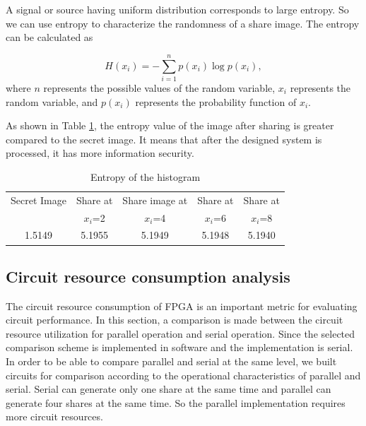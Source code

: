 A signal or source having uniform distribution corresponds to large entropy. So we can use entropy to characterize the randomness of a share image. The entropy can be calculated as

\begin{equation}
H(x_{i})=-\sum_{i=1}^{n} p\left(x_{i}\right) \log p\left(x_{i}\right),
\end{equation}where $n$ represents the possible values of the random variable, $x_{i}$ represents the random variable, and $p\left ( x_{i} \right ) $ represents the probability function of $x_{i}$.

As shown in Table \ref{tab1}, the entropy value of the image after sharing is greater compared to the secret image. It means that after the designed system is processed, it has more information security.

\begin{table}[!htb]
	\begin{center}
	\caption{Entropy of the histogram}\label{tab1}%
	\begin{tabular}{ccccc}
		\toprule
		Secret Image&Share at&Share image at&Share at&Share at\\
		&$x_{i}$=2&$x_{i}$=4&$x_{i}$=6&$x_{i}$=8\\
		\midrule
		1.5149&5.1955&5.1949&5.1948&5.1940\\
		\bottomrule
	\end{tabular}
	\end{center}
\end{table}

\subsection{Circuit resource consumption analysis}\label{subsec52}

The circuit resource consumption of FPGA is an important metric for evaluating circuit performance. In this section, a comparison is made between the circuit resource utilization for parallel operation and serial operation. {\color{red}Since the selected comparison scheme is implemented in software and the implementation is serial. In order to be able to compare parallel and serial at the same level, we built circuits for comparison according to the operational characteristics of parallel and serial. Serial can generate only one share at the same time and parallel can generate four shares at the same time. So the parallel implementation requires more circuit resources.}

